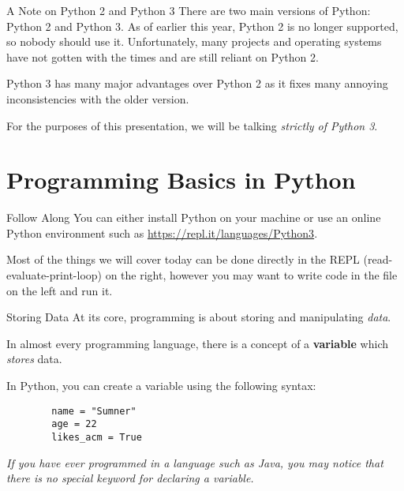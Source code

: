 \documentclass{acm}
\begin{document}
\begin{frame}{A Note on Python 2 and Python 3}
    There are two main versions of Python: Python 2 and Python 3. As of earlier
    this year, Python 2 is no longer supported, so nobody should use it.
    Unfortunately, many projects and operating systems have not gotten with the
    times and are still reliant on Python 2.

    \pause
    Python 3 has many major advantages over Python 2 as it fixes many annoying
    inconsistencies with the older version.

    \pause
    For the purposes of this presentation, we will be talking \emph{strictly of
    Python 3}.
\end{frame}

\section{Programming Basics in Python}

\begin{frame}{Follow Along}
    You can either install Python on your machine or use an online Python
    environment such as \url{https://repl.it/languages/Python3}.

    Most of the things we will cover today can be done directly in the REPL
    (read-evaluate-print-loop) on the right, however you may want to write code
    in the file on the left and run it.
\end{frame}

\begin{frame}[fragile]{Storing Data}
    At its core, programming is about storing and manipulating \textit{data}.

    \pause
    In almost every programming language, there is a concept of a
    \textbf{variable} which \textit{stores} data.

    \pause
    In Python, you can create a variable using the following syntax:
    \begin{verbatim}
        name = "Sumner"
        age = 22
        likes_acm = True
    \end{verbatim}

    \textit{If you have ever programmed in a language such as Java, you may
    notice that there is no special keyword for declaring a variable.}
\end{frame}
\end{document}
